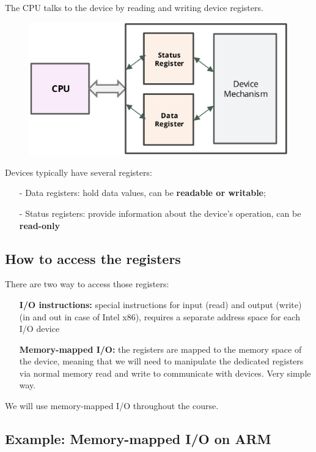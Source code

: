 The CPU talks to the device by reading and writing device registers.

\begin{figure}[H]
    \centering
    \includegraphics[width=0.6\linewidth]{img/image41.png}
\end{figure}

Devices typically have several registers:

\begin{itemize}
    \item[-] Data registers: hold data values, can be \textbf{readable or writable};
    \item[-] Status registers: provide information about the device's operation, can be \textbf{read-only}
\end{itemize}


\subsection{How to access the registers}

There are two way to access those registers:

\begin{itemize}
    \item[] \textbf{I/O instructions:} special instructions for input (read) and output (write) (in and out in case of Intel x86), requires a separate address space for each I/O device
    \item[] \textbf{Memory-mapped I/O:} the registers are mapped to the memory space of the device, meaning that we will need to manipulate the dedicated registers via normal memory read and write to communicate with devices. Very simple way.
\end{itemize}

We will use memory-mapped I/O throughout the course.


\subsection*{Example: Memory-mapped I/O on ARM}

